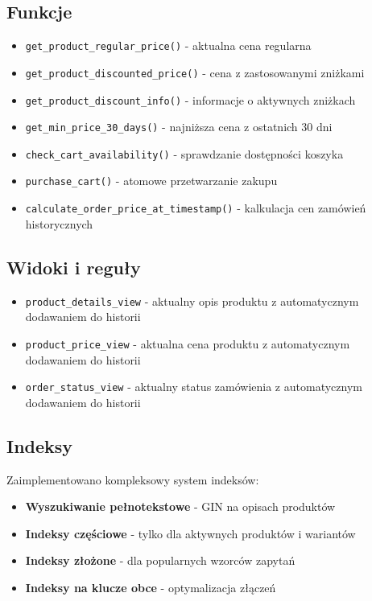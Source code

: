 \subsection*{Funkcje}
\begin{itemize}
    \item \texttt{get\_product\_regular\_price()} - aktualna cena regularna
    \item \texttt{get\_product\_discounted\_price()} - cena z zastosowanymi zniżkami
    \item \texttt{get\_product\_discount\_info()} - informacje o aktywnych zniżkach
    \item \texttt{get\_min\_price\_30\_days()} - najniższa cena z ostatnich 30 dni
    \item \texttt{check\_cart\_availability()} - sprawdzanie dostępności koszyka
    \item \texttt{purchase\_cart()} - atomowe przetwarzanie zakupu
    \item \texttt{calculate\_order\_price\_at\_timestamp()} - kalkulacja cen zamówień historycznych
\end{itemize}

\subsection*{Widoki i reguły}
\begin{itemize}
    \item \texttt{product\_details\_view} - aktualny opis produktu z automatycznym dodawaniem do historii
    \item \texttt{product\_price\_view} - aktualna cena produktu z automatycznym dodawaniem do historii
    \item \texttt{order\_status\_view} - aktualny status zamówienia z automatycznym dodawaniem do historii
\end{itemize}

\subsection*{Indeksy}
Zaimplementowano kompleksowy system indeksów:
\begin{itemize}
    \item \textbf{Wyszukiwanie pełnotekstowe} - GIN na opisach produktów
    \item \textbf{Indeksy częściowe} - tylko dla aktywnych produktów i wariantów
    \item \textbf{Indeksy złożone} - dla popularnych wzorców zapytań
    \item \textbf{Indeksy na klucze obce} - optymalizacja złączeń
\end{itemize}

